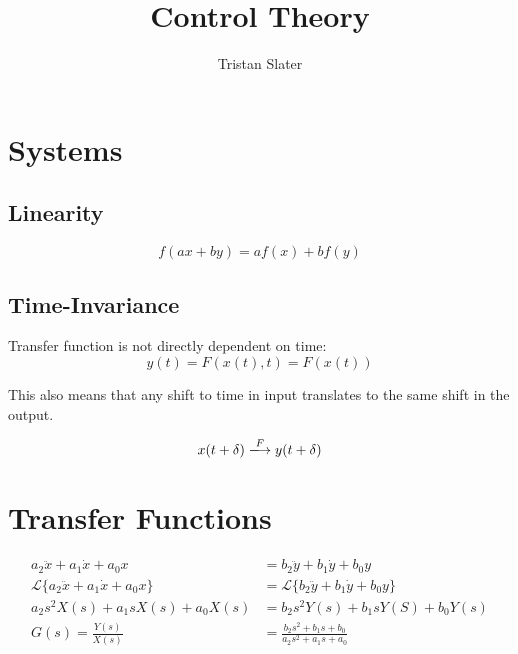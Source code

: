 \documentclass{article}
\title{Control Theory}
\author{Tristan Slater}
\begin{document}
    \maketitle

    \section{Systems}

    \subsection{Linearity}

    \begin{equation}
        f(ax + by) = af(x) + bf(y)
    \end{equation}

    \subsection{Time-Invariance}

    Transfer function is not directly dependent on time: \begin{equation}
        y(t) = F(x(t), t) = F(x(t))
    \end{equation}

    This also means that any shift to time in input translates to the same shift in the output.

    \begin{equation}
        x(t + \delta) \xlongrightarrow{F} y(t + \delta)
    \end{equation}

    \section{Transfer Functions}

    $$\begin{aligned}
        a_2\ddot{x} + a_1\dot{x} + a_0x &= b_2\ddot{y} + b_1\dot{y} + b_0y \\
        \mathscr{L}\{a_2\ddot{x} + a_1\dot{x} + a_0x\} &= \mathscr{L}\{b_2\ddot{y} + b_1\dot{y} + b_0y\} \\
        a_2s^2X(s) + a_1sX(s) + a_0X(s) &= b_2s^2Y(s) + b_1sY(S) + b_0Y(s) \\
        G(s) = \frac{Y(s)}{X(s)} &= \frac{b_2s^2 + b_1s + b_0}{a_2s^2 + a_1s + a_0} \\
    \end{aligned}$$
\end{document}
